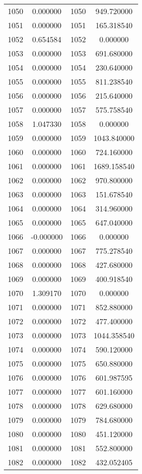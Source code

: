 \documentclass[12pt]{article}
\begin{document}
\begin{longtable}{@{}cccc@{}}
1050 & 0.000000 & 1050 & 949.720000 \\
1051 & 0.000000 & 1051 & 165.318540 \\
1052 & 0.654584 & 1052 & 0.000000 \\
1053 & 0.000000 & 1053 & 691.680000 \\
1054 & 0.000000 & 1054 & 230.640000 \\
1055 & 0.000000 & 1055 & 811.238540 \\
1056 & 0.000000 & 1056 & 215.640000 \\
1057 & 0.000000 & 1057 & 575.758540 \\
1058 & 1.047330 & 1058 & 0.000000 \\
1059 & 0.000000 & 1059 & 1043.840000 \\
1060 & 0.000000 & 1060 & 724.160000 \\
1061 & 0.000000 & 1061 & 1689.158540 \\
1062 & 0.000000 & 1062 & 970.800000 \\
1063 & 0.000000 & 1063 & 151.678540 \\
1064 & 0.000000 & 1064 & 314.960000 \\
1065 & 0.000000 & 1065 & 647.040000 \\
1066 & -0.000000 & 1066 & 0.000000 \\
1067 & 0.000000 & 1067 & 775.278540 \\
1068 & 0.000000 & 1068 & 427.680000 \\
1069 & 0.000000 & 1069 & 400.918540 \\
1070 & 1.309170 & 1070 & 0.000000 \\
1071 & 0.000000 & 1071 & 852.880000 \\
1072 & 0.000000 & 1072 & 477.400000 \\
1073 & 0.000000 & 1073 & 1044.358540 \\
1074 & 0.000000 & 1074 & 590.120000 \\
1075 & 0.000000 & 1075 & 650.880000 \\
1076 & 0.000000 & 1076 & 601.987595 \\
1077 & 0.000000 & 1077 & 601.160000 \\
1078 & 0.000000 & 1078 & 629.680000 \\
1079 & 0.000000 & 1079 & 784.680000 \\
1080 & 0.000000 & 1080 & 451.120000 \\
1081 & 0.000000 & 1081 & 552.800000 \\
1082 & 0.000000 & 1082 & 432.052405 \\

\end{longtable}
\end{document}
